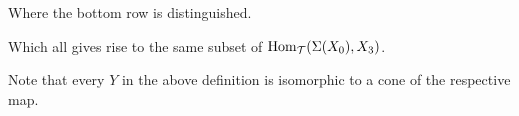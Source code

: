 \begin{definition}
\begin{enumerate}
{        Where the bottom row is distinguished.
    }
    \end{enumerate}

    Which all gives rise to the same subset of \( \operatorname{Hom}_{\mathcal{T}}(\Sigma(X_0), X_3) \).
\end{definition}

\begin{remark}
    Note that every \( Y \) in the above definition is isomorphic to a cone of the respective map.
\end{remark}